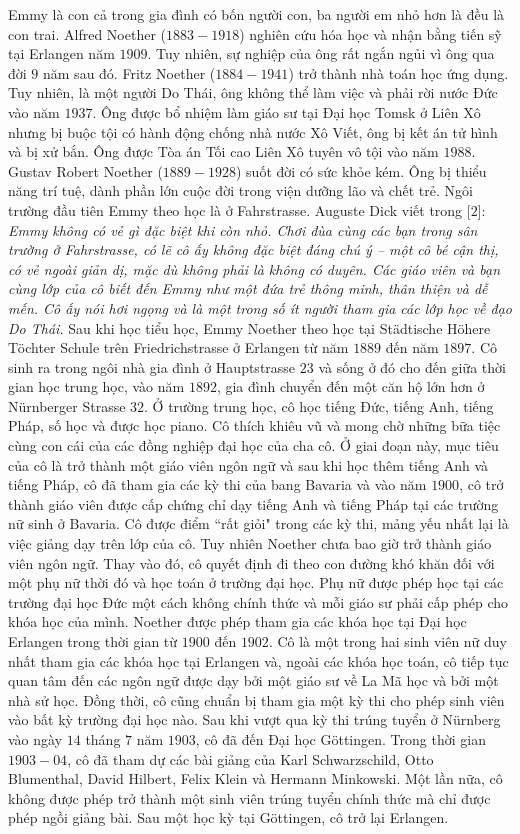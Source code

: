 \begin{multicols}{2}
	\vskip 0.05cm
	Emmy là con cả trong gia đình có bốn người con, ba người em nhỏ hơn là đều là con trai. Alfred Noether ($1883-1918$) nghiên cứu hóa học và nhận bằng tiến sỹ tại Erlangen năm $1909$. Tuy nhiên, sự nghiệp của ông rất ngắn ngủi vì ông qua đời $9$ năm sau đó. Fritz Noether ($1884-1941$) trở thành nhà toán học ứng dụng. Tuy nhiên, là một người Do Thái, ông không thể làm việc và phải rời nước Đức vào năm $1937$. Ông được bổ nhiệm làm giáo sư tại Đại học Tomsk ở Liên Xô nhưng bị buộc tội có hành động chống nhà nước  Xô Viết, ông bị kết án tử hình và bị xử bắn. Ông được Tòa án Tối cao Liên Xô tuyên vô tội vào năm $1988$. Gustav Robert Noether ($1889-1928$) suốt đời có sức khỏe kém. Ông bị thiểu năng trí tuệ, dành phần lớn cuộc đời trong viện dưỡng lão và chết trẻ. Ngôi trường đầu tiên Emmy theo học là ở Fahrstrasse. Auguste Dick viết trong [$2$]:
	\vskip 0.05cm
	\textit{Emmy không có vẻ gì đặc biệt khi còn nhỏ. Chơi đùa cùng các bạn trong sân trường ở Fahrstrasse, có lẽ cô ấy không đặc biệt đáng chú ý -- một cô bé cận thị, có vẻ ngoài giản dị, mặc dù không phải là không có duyên. Các giáo viên và bạn cùng lớp của cô biết đến Emmy như một đứa trẻ thông minh, thân thiện và dễ mến. Cô ấy nói hơi ngọng và là một trong số ít người tham gia các lớp học về đạo Do Thái.}
	\vskip 0.05cm
	Sau khi học tiểu học, Emmy Noether theo học tại Städtische Höhere Töchter Schule trên Friedrichstrasse ở Erlangen từ năm $1889$ đến năm $1897$. Cô sinh ra trong ngôi nhà gia đình ở Hauptstrasse $23$ và sống ở đó cho đến giữa thời gian học trung học, vào năm $1892$, gia đình chuyển đến một căn hộ lớn hơn ở Nürnberger Strasse $32$. Ở trường trung học, cô học tiếng Đức, tiếng Anh, tiếng Pháp, số học và được học piano. Cô thích khiêu vũ và mong chờ những bữa tiệc cùng con cái của các đồng nghiệp đại học của cha cô. Ở giai đoạn này, mục tiêu của cô là trở thành một giáo viên ngôn ngữ và sau khi học thêm tiếng Anh và tiếng Pháp, cô đã tham gia các kỳ thi của bang Bavaria và vào năm $1900$, cô trở thành giáo viên được cấp chứng chỉ dạy tiếng Anh và tiếng Pháp tại các trường nữ sinh ở Bavaria. Cô được điểm ``rất giỏi" trong các kỳ thi, mảng yếu nhất lại là việc giảng dạy trên lớp của cô.
	\vskip 0.05cm
	Tuy nhiên Noether chưa bao giờ trở thành giáo viên ngôn ngữ. Thay vào đó, cô quyết định đi theo con đường khó khăn đối với một phụ nữ thời đó và học toán ở trường đại học. Phụ nữ được phép học tại các trường đại học Đức một cách không chính thức và mỗi giáo sư phải cấp phép cho khóa học của mình. Noether được phép tham gia các khóa học tại Đại học Erlangen trong thời gian từ $1900$ đến $1902$. Cô là một trong hai sinh viên nữ duy nhất tham gia các khóa học tại Erlangen và, ngoài các khóa học toán, cô tiếp tục quan tâm đến các ngôn ngữ được dạy bởi một giáo sư về La Mã học và bởi một nhà sử học. Đồng thời, cô cũng chuẩn bị tham gia một kỳ thi cho phép sinh viên vào bất kỳ trường đại học nào. Sau khi vượt qua kỳ thi trúng tuyển ở Nürnberg vào ngày $14$ tháng $7$ năm $1903$, cô đã đến Đại học Göttingen. Trong thời gian $1903-04$, cô đã tham dự các bài giảng của Karl Schwarzschild, Otto Blumenthal, David Hilbert, Felix Klein và Hermann Minkowski. Một lần nữa, cô không được phép trở thành một sinh viên trúng tuyển chính thức mà chỉ được phép ngồi giảng bài. Sau một học kỳ tại Göttingen, cô trở lại Erlangen.

\end{multicols}
